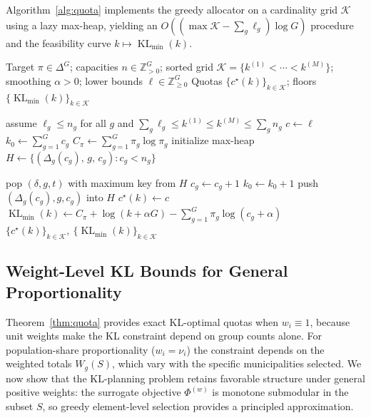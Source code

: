 \documentclass[10pt,journal]{IEEEtran}
\newcommand{\1}{\mathbf{1}}
\DeclareMathOperator{\KL}{KL}
\theoremstyle{ieeethm}
\begin{document}
Algorithm~\ref{alg:quota} implements the greedy allocator on a cardinality grid $\mathcal{K}$ using a lazy max-heap, yielding an $O((\max\mathcal{K}-\sum_g \ell_g)\log G)$ procedure and the feasibility curve $k\mapsto \KL_{\min}(k)$.

\begin{algorithm}[t]
\caption{KL-Optimal Count-Quota Path and Floors on a Cardinality Grid (Lazy Heap)}
\label{alg:quota}
\begin{algorithmic}[1]
\Require
Target $\pi\in\Delta^G$; capacities $n\in\mathbb{Z}_{>0}^G$; sorted grid $\mathcal{K}=\{k^{(1)}<\cdots<k^{(M)}\}$;
smoothing $\alpha>0$; lower bounds $\ell\in\mathbb{Z}_{\ge 0}^G$
\Ensure
Quotas $\{c^\star(k)\}_{k\in\mathcal{K}}$; floors $\{\KL_{\min}(k)\}_{k\in\mathcal{K}}$

\State assume $\ell_g\le n_g$ for all $g$ and $\sum_g \ell_g\le k^{(1)}\le k^{(M)}\le \sum_g n_g$
\State $c\gets \ell$
\State $k_0\gets \sum_{g=1}^G c_g$
\State $C_\pi\gets \sum_{g=1}^G \pi_g\log\pi_g$
\State initialize max-heap $H \gets \{(\Delta_g(c_g),\,g,\,c_g): c_g<n_g\}$

        \State pop $(\delta,g,t)$ with maximum key from $H$
            \State \algorithmiccontinue
        \EndIf
            \State \algorithmiccontinue
        \EndIf
        \State $c_g\gets c_g+1$
        \State $k_0\gets k_0+1$
            \State push $(\Delta_g(c_g),g,c_g)$ into $H$
        \EndIf
    \EndWhile
    \State $c^\star(k)\gets c$
    \State $\KL_{\min}(k)\gets C_\pi + \log(k+\alpha G) - \sum_{g=1}^G \pi_g\log(c_g+\alpha)$
\EndFor
\State \Return $\{c^\star(k)\}_{k\in\mathcal{K}},\ \{\KL_{\min}(k)\}_{k\in\mathcal{K}}$
\end{algorithmic}
\end{algorithm}

\subsection{Weight-Level KL Bounds for General Proportionality}
\label{subsec:weight_level_kl}

Theorem~\ref{thm:quota} provides exact KL-optimal quotas when $w_i\equiv 1$, because unit weights
make the KL constraint depend on group counts alone. For population-share proportionality
($w_i=\nu_i$) the constraint depends on the weighted totals $W_g(S)$, which vary with the
specific municipalities selected. We now show that the KL-planning problem retains favorable
structure under general positive weights: the surrogate objective $\Phi^{(w)}$ is monotone
submodular in the subset $S$, so greedy element-level selection provides a principled
approximation.
\end{document}
